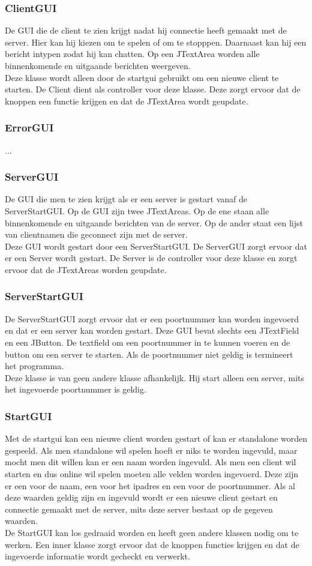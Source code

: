 \documentclass[12pt]{article}
\begin{document}
\subsubsection{ClientGUI}
De GUI die de client te zien krijgt nadat hij connectie heeft gemaakt met de server. Hier kan hij kiezen om te spelen of om te stopppen. Daarnaast kan hij een bericht intypen zodat hij kan chatten. Op een JTextArea worden alle binnenkomende en uitgaande berichten weergeven.\\
Deze klasse wordt alleen door de startgui gebruikt om een nieuwe client te starten. De Client dient als controller voor deze klasse. Deze zorgt ervoor dat de knoppen een functie krijgen en dat de JTextArea wordt geupdate.
\subsubsection{ErrorGUI}
...
\subsubsection{ServerGUI}
De GUI die men te zien krijgt als er een server is gestart vanaf de ServerStartGUI. Op de GUI zijn twee JTextAreas. Op de ene staan alle binnenkomende en uitgaande berichten van de server. Op de ander staat een lijst van clientnamen die geconnect zijn met de server.\\
Deze GUI wordt gestart door een ServerStartGUI. De ServerGUI zorgt ervoor dat er een Server wordt gestart. De Server is de controller voor deze klasse en zorgt ervoor dat de JTextAreas worden geupdate.
\subsubsection{ServerStartGUI}
De ServerStartGUI zorgt ervoor dat er een poortnummer kan worden ingevoerd en dat er een server kan worden gestart. Deze GUI bevat slechts een JTextField en een JButton. De textfield om een poortnummer in te kunnen voeren en de button om een server te starten. Als de poortnummer niet geldig is termineert het programma.\\
Deze klasse is van geen andere klasse afhankelijk. Hij start alleen een server, mits het ingevoerde poortnummer is geldig.
\subsubsection{StartGUI}
Met de startgui kan een nieuwe client worden gestart of kan er standalone worden gespeeld. Als men standalone wil spelen hoeft er niks te worden ingevuld, maar mocht men dit willen kan er een naam worden ingevuld. Als men een client wil starten en dus online wil spelen moeten alle velden worden ingevoerd. Deze zijn er een voor de naam, een voor het ipadres en een voor de poortnummer. Als al deze waarden geldig zijn en ingevuld wordt er een nieuwe client gestart en connectie gemaakt met de server, mits deze server bestaat op de gegeven waarden.\\
De StartGUI kan los gedraaid worden en heeft geen andere klassen nodig om te werken. Een inner klasse zorgt ervoor dat de knoppen functies krijgen en dat de ingevoerde informatie wordt gecheckt en verwerkt.
\end{document}
